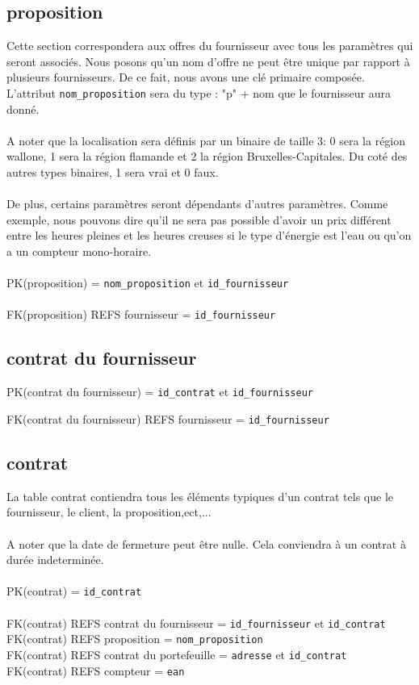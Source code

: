 \subsection{proposition}
Cette section correspondera aux offres du fournisseur avec tous les paramètres qui seront associés. Nous posons qu'un nom d'offre ne peut être unique par rapport à plusieurs fournisseurs. De ce fait, nous avons une clé primaire composée. L'attribut \texttt{nom\_proposition} sera du type : "p" + nom que le fournisseur aura donné.
\\ \\
A noter que la localisation sera définis par un binaire de taille 3: 0 sera la région wallone, 1 sera la région flamande et 2 la région Bruxelles-Capitales. Du coté des autres types binaires, 1 sera vrai et 0 faux. 
\\ \\
De plus, certains paramètres seront dépendants d'autres paramètres. Comme exemple, nous pouvons dire qu'il ne sera pas possible d'avoir  un prix différent entre les heures pleines et les heures creuses si le type d'énergie est l'eau ou qu'on a un compteur mono-horaire.
\\ \\
PK(proposition) = \texttt{nom\_proposition} et \texttt{id\_fournisseur}
\\ \\
FK(proposition) REFS fournisseur = \texttt{id\_fournisseur}
\subsection{contrat du fournisseur}
\begin{flushleft}
PK(contrat du fournisseur) = \texttt{id\_contrat} et \texttt{id\_fournisseur}
\end{flushleft}
FK(contrat du fournisseur) REFS fournisseur = \texttt{id\_fournisseur}
\subsection{contrat}
La table contrat contiendra tous les éléments typiques d'un contrat tels que le fournisseur, le client, la proposition,ect,...
\\ \\
A noter que la date de fermeture peut être nulle. Cela conviendra à un contrat à durée indeterminée.
\\ \\
PK(contrat) = \texttt{id\_contrat}
\\ \\
FK(contrat) REFS contrat du fournisseur = \texttt{id\_fournisseur} et \texttt{id\_contrat}
\\
FK(contrat) REFS proposition = \texttt{nom\_proposition}
\\ 
FK(contrat) REFS contrat du portefeuille = \texttt{adresse} et \texttt{id\_contrat}
\\
FK(contrat) REFS compteur = \texttt{ean}
\newpage
